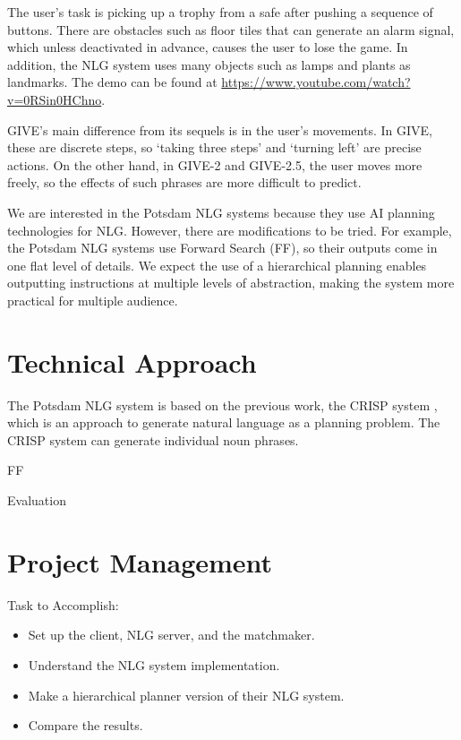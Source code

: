 \documentclass[11pt]{article} %
\begin{document}
The user's task is picking up a trophy from a safe after pushing a sequence of buttons.
There are obstacles such as floor tiles that can generate an alarm signal,
which unless deactivated in advance, causes the user to lose the game.
In addition, the NLG system uses many objects such as lamps and plants as landmarks.
The demo can be found at \url{https://www.youtube.com/watch?v=0RSin0HChno}.

GIVE's main difference from its sequels is in the user's movements.
In GIVE, these are discrete steps, so `taking three steps' and `turning left' are precise actions.
On the other hand, in GIVE-2 and GIVE-2.5, the user moves more freely,
so the effects of such phrases are more difficult to predict.

We are interested in the Potsdam NLG systems \cite{garoufi2011potsdam}
because they use AI planning technologies for NLG.
However, there are modifications to be tried.
For example, the Potsdam NLG systems use Forward Search (FF),
so their outputs come in one flat level of details.
We expect the use of a hierarchical planning enables outputting instructions
at multiple levels of abstraction, making the system more practical
for multiple audience.

\section{Technical Approach}

The Potsdam NLG system \cite{garoufi2011combining, garoufi2011potsdam, garoufi2014generation}
is based on the previous work, the CRISP system \cite{crisp07}, which is an approach to
generate natural language as a planning problem.
The CRISP system can generate individual noun phrases. 

FF

Evaluation

\section{Project Management}

Task to Accomplish:
\begin{itemize}
  \item Set up the client, NLG server, and the matchmaker.
  \item Understand the NLG system implementation.
  \item Make a hierarchical planner version of their NLG system.
  \item Compare the results.
\end{itemize}
\end{document}
